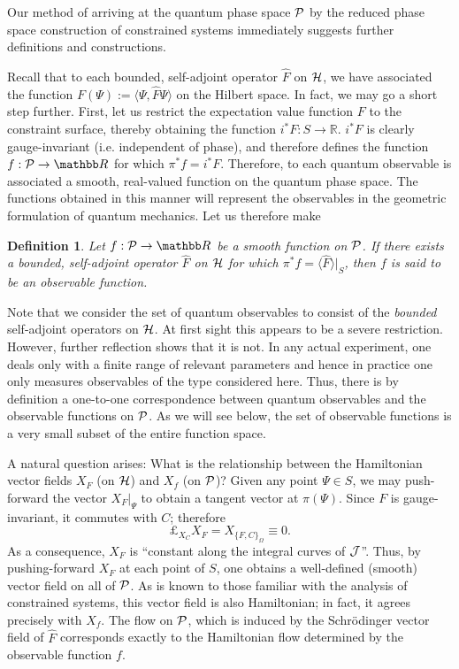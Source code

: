 \documentclass[12pt,aps,eqsecnum,tighten]{revtex4-2}
\newtheorem{definition}{Definition}[section]
\def\<{\langle}
\def\>{\rangle}
\def\H{{\cal H}}
\def\P{{\cal P}}
\def\W{\Omega}
\def\J{{\cal J}}
\newcommand{\lie}[1]{{\pounds}_{#1}}
\newcommand{\hvf}[1]{{X_{#1}}}
\def\R{\mathbb R}
\begin{document}
Our method of arriving at the quantum phase space $\P$ by the reduced
phase space construction of constrained systems immediately suggests
further definitions and constructions.

Recall that to each bounded, self-adjoint operator $\hat{F}$ on $\H$,
we have associated the function $F(\Psi) := \< \Psi, \hat{F} \Psi \>$
on the Hilbert space.  In fact, we may go a short step further.
First, let us restrict the expectation value function $F$ to the
constraint surface, thereby obtaining the function $i^*F : S
\rightarrow \R$.  $i^*F$ is clearly gauge-invariant (i.e. independent
of phase), and therefore defines the function $f: \P \rightarrow \R$
for which $\pi^*f = i^*F$.  Therefore, to each quantum observable is
associated a smooth, real-valued function on the quantum phase space.
The functions obtained in this manner will represent the observables
in the geometric formulation of quantum mechanics. Let us therefore
make
%
\begin{definition} \label{defn_observable_fn}
Let $f: \P \rightarrow \R$ be a smooth function on $\P$.  If there
exists a bounded, self-adjoint operator $\hat{F}$ on $\H$ for which
$\pi^*f = \< \hat{F} \>\big|_S$, then $f$ is said to be an {\em
observable function}.
\end{definition}
\noindent
Note that we consider the set of quantum observables to consist of the
{\em bounded} self-adjoint operators on $\H$. At first sight this
appears to be a severe restriction. However, further reflection shows
that it is not. In any actual experiment, one deals only with a finite
range of relevant parameters and hence in practice one only measures
observables of the type considered here.  Thus, there is by definition
a one-to-one correspondence between quantum observables and the
observable functions on $\P$.  As we will see below, the set of
observable functions is a very small subset of the entire function
space.

A natural question arises: What is the relationship between the
Hamiltonian vector fields $\hvf{F}$ (on $\H$) and $\hvf{f}$ (on $\P$)?
Given any point $\Psi \in S$, we may push-forward the vector
$\hvf{F}\big|_\Psi$ to obtain a tangent vector at $\pi(\Psi)$.  Since
$F$ is gauge-invariant, it commutes with $C$; therefore
%
\[	\lie{\hvf{C}} \hvf{F} = \hvf{ \{ F, C\}_\W} \equiv 0.	\]
%
As a consequence, $\hvf{F}$ is ``constant along the integral curves of
$\J$''.  Thus, by pushing-forward $\hvf{F}$ at each point of $S$, one
obtains a well-defined (smooth) vector field on all of $\P$.  As is
known to those familiar with the analysis of constrained systems, this
vector field is also Hamiltonian; in fact, it agrees precisely with
$\hvf{f}$.  The flow on $\P$, which is induced by the Schr\"odinger
vector field of $\hat{F}$ corresponds exactly to the Hamiltonian flow
determined by the observable function $f$.
\end{document}
